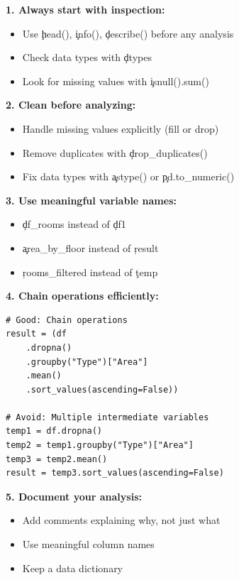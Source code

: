 

\begin{tcolorbox}[
    title=Data Analysis Best Practices,
    colframe=blue,
    colback=white,
    arc=2mm
]
\textbf{1. Always start with inspection:}
\begin{itemize}
\item Use \c{head()}, \c{info()}, \c{describe()} before any analysis
\item Check data types with \c{dtypes}
\item Look for missing values with \c{isnull().sum()}
\end{itemize}

\textbf{2. Clean before analyzing:}
\begin{itemize}
\item Handle missing values explicitly (fill or drop)
\item Remove duplicates with \c{drop_duplicates()}
\item Fix data types with \c{astype()} or \c{pd.to_numeric()}
\end{itemize}

\textbf{3. Use meaningful variable names:}
\begin{itemize}
\item \c{df_rooms} instead of \c{df1}
\item \c{area_by_floor} instead of \c{result}
\item \c{rooms_filtered} instead of \c{temp}
\end{itemize}

\textbf{4. Chain operations efficiently:}
\begin{verbatim}
# Good: Chain operations
result = (df
    .dropna()
    .groupby("Type")["Area"]
    .mean()
    .sort_values(ascending=False))

# Avoid: Multiple intermediate variables
temp1 = df.dropna()
temp2 = temp1.groupby("Type")["Area"]
temp3 = temp2.mean()
result = temp3.sort_values(ascending=False)
\end{verbatim}

\textbf{5. Document your analysis:}
\begin{itemize}
\item Add comments explaining why, not just what
\item Use meaningful column names
\item Keep a data dictionary
\end{itemize}
\end{tcolorbox}

